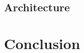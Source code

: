 \documentclass[a4paper, 11pt, oneside]{elsarticle}
\begin{document}
\subsection{Architecture}

\section{Conclusion}



\newpage



\end{document}
